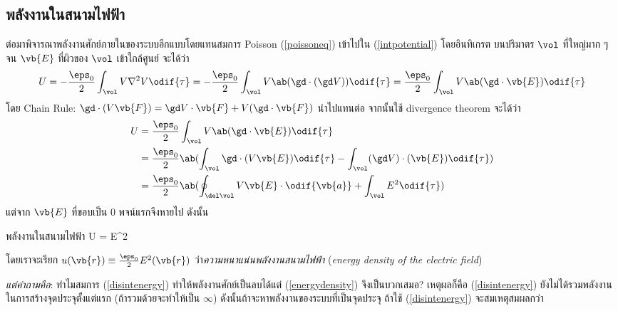 \subsection{พลังงานในสนามไฟฟ้า}
ต่อมาพิจารณาพลังงานศักย์ภายในของระบบอีกแบบโดยแทนสมการ Poisson (\ref{poissoneq}) เข้าไปใน (\ref{intpotential}) โดยอินทิเกรต บนปริมาตร $\vol$ ที่ใหญ่มาก ๆ จน $\vb{E}$ ที่ผิวของ $\vol$ เข้าใกล้ศูนย์ จะได้ว่า
\[ 
U=-\frac{\eps_0}{2}\int_\vol V\nabla^2 V\odif{\tau}=-\frac{\eps_0}{2}\int_\vol V\ab(\gd\cdot(\gd V))\odif{\tau}=\frac{\eps_0}{2}\int_\vol V\ab(\gd\cdot\vb{E})\odif{\tau}
\]
โดย Chain Rule: $\gd\cdot( V\vb{F})=\gd V\cdot\vb{F}+ V(\gd\cdot\vb{F})$ นำไปแทนต่อ จากนั้นใช้ divergence theorem จะได้ว่า
\begin{align*}
    U&=\frac{\eps_0}{2}\int_\vol V\ab(\gd\cdot\vb{E})\odif{\tau}\\
    &=\frac{\eps_0}{2}\ab(\int_\vol\gd\cdot( V\vb{E})\odif{\tau}-\int_\vol(\gd V)\cdot(\vb{E})\odif{\tau})\\
    &=\frac{\eps_0}{2}\ab(\oint_{\del\vol} V\vb{E}\cdot\odif{\vb{a}}+\int_\vol E^2\odif{\tau})
\end{align*}
แต่จาก $\vb{E}$ ที่ขอบเป็น $0$ พจน์แรกจึงหายไป ดังนั้น
\begin{ieqbox}{พลังงานในสนามไฟฟ้า}
    U = \int E^2\odif{\tau}\label{energydensity}
\end{ieqbox}
โดยเราจะเรียก $u(\vb{r}) \equiv \frac{\eps_0}{2} E^2(\vb{r})$ ว่า\emph{ความหนาแน่นพลังงานสนามไฟฟ้า} (\emph{energy density of the electric field})

\emph{แต่คำถามคือ}: ทำไมสมการ (\ref{disintenergy}) ทำให้พลังงานศักย์เป็นลบได้แต่ (\ref{energydensity}) จึงเป็นบวกเสมอ? เหตุผลก็คือ (\ref{disintenergy}) ยังไม่ได้รวมพลังงานในการสร้างจุดประจุตั้งแต่แรก (ถ้ารวมด้วยจะทำให้เป็น $\infty$) ดังนั้นถ้าจะหาพลังงานของระบบที่เป็นจุดประจุ ถ้าใช้ (\ref{disintenergy}) จะสมเหตุสมผลกว่า

